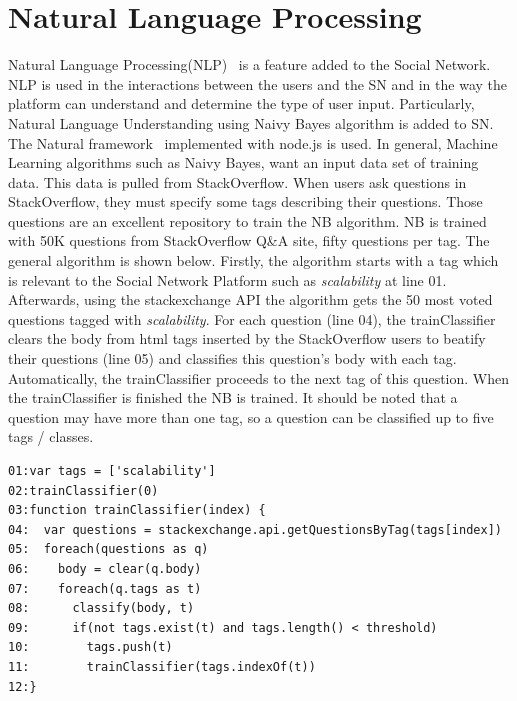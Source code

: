 \section{Natural Language Processing}
Natural Language Processing(NLP)~\cite{manning1999foundations} is a feature added to the Social Network. NLP is used in the interactions between the users and the SN and in the way the platform can understand and determine the type of user input. Particularly, Natural Language Understanding using Naivy Bayes algorithm is added to SN. The Natural framework~\cite{nodenatural_url} implemented with node.js is used. In general, Machine Learning algorithms such as Naivy Bayes, want an input data set of training data. This data is pulled from StackOverflow. When users ask questions in StackOverflow, they must specify some tags describing their questions. Those questions are an excellent repository to train the NB algorithm. NB is trained with 50K questions from StackOverflow Q\&A site, fifty questions per tag. The general algorithm is shown below. Firstly, the algorithm starts with a tag which is relevant to the Social Network Platform such as \emph{scalability} at line 01. Afterwards, using the stackexchange API the algorithm gets the 50 most voted questions tagged with \emph{scalability}. For each question (line 04), the trainClassifier clears the body from html tags inserted by the StackOverflow users to beatify their questions (line 05) and classifies this question's body with each tag. Automatically, the trainClassifier proceeds to the next tag of this question. When the trainClassifier is finished the NB is trained. It should be noted that a question may have more than one tag, so a question can be classified up to five tags / classes.

\begin{lstlisting} 
01:var tags = ['scalability']
02:trainClassifier(0)
03:function trainClassifier(index) {
04:  var questions = stackexchange.api.getQuestionsByTag(tags[index])
05:  foreach(questions as q)
06:    body = clear(q.body)
07:    foreach(q.tags as t)
08:    	 classify(body, t)
09:    	 if(not tags.exist(t) and tags.length() < threshold)
10:    	   tags.push(t)	  
11:        trainClassifier(tags.indexOf(t))
12:}		
\end{lstlisting}